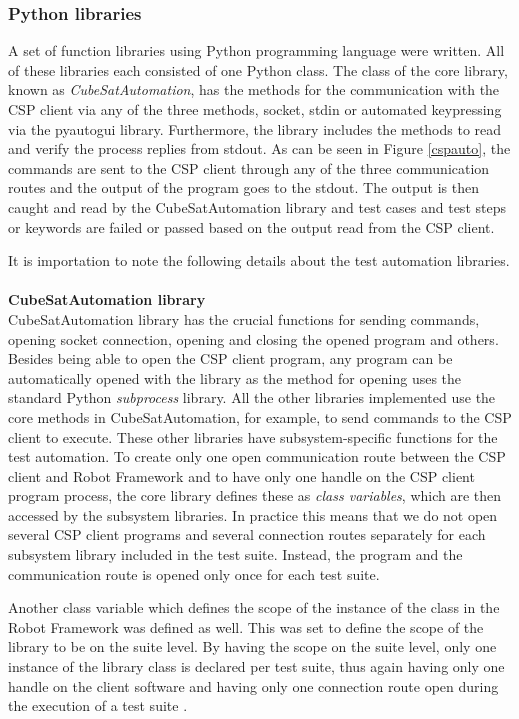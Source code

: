 \documentclass[english,12pt,a4paper,pdftex,elec,utf8]{aaltothesis}
\begin{document}
\subsubsection{Python libraries}
A set of function libraries using Python programming language were written. All of these libraries each consisted of one Python class. The class of the core library, known as \textit{CubeSatAutomation}, has the methods for the communication with the CSP client via any of the three methods, socket, stdin or automated keypressing via the pyautogui library. Furthermore, the library includes the methods to read and verify the process replies from stdout.
As can be seen in Figure \ref{cspauto}, the commands are sent to the CSP client through any of the three communication routes and the output of the program goes to the stdout. The output is then caught and read by the CubeSatAutomation library and test cases and test steps or keywords are failed or passed based on the output read from the CSP client. \par
It is importation to note the following details about the test automation libraries. 
\\
\\
\textbf{CubeSatAutomation library}\\
CubeSatAutomation library has the crucial functions for sending commands, opening socket connection, opening and closing the opened program and others. Besides being able to open the CSP client program, any program can be automatically opened with the library as the method for opening uses the standard Python \textit{subprocess} library. All the other libraries implemented use the core methods in CubeSatAutomation, for example, to send commands to the CSP client to execute. These other libraries have subsystem-specific functions for the test automation. To create only one open communication route between the CSP client and Robot Framework and to have only one handle on the CSP client program process, the core library defines these as \textit{class variables}, which are then accessed by the subsystem libraries. In practice this means that we do not open several CSP client programs and several connection routes separately for each subsystem library included in the test suite. Instead, the program and the communication route is opened only once for each test suite.\par 
Another class variable which defines the scope of the instance of the class in the Robot Framework was defined as well. This was set to define the scope of the library to be on the suite level. By having the scope on the suite level, only one instance of the library class is declared per test suite, thus again having only one handle on the client software and having only one connection route open during the execution of a test suite \cite{robotuserguide}.\par 
\end{document}
